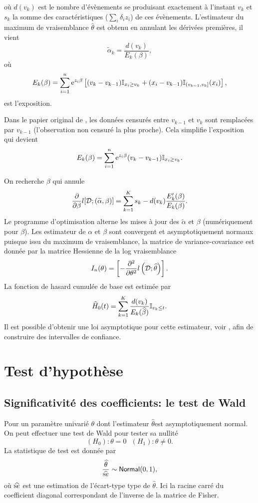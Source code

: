 où $d(v_k)$ est le nombre d'évènements se produisant exactement à l'instant $v_k$ et $s_k$ la somme des caractéristiques ($\sum_i \delta_i z_i$) de ces évènements. L'estimateur du maximum de vraisemblance $\widehat{\theta}$ est obtenu en annulant les dérivées premières, il vient 
$$
\widetilde{\alpha}_k = \frac{d(v_k)}{E_k(\beta)}, 
$$
où 
$$
E_k(\beta) = \sum_{i=1}^{n}\mathrm{e}^{z_i\beta}\left[(v_k - v_{k-1})\mathbb{I}_{x_i\geq v_k} +(x_i - v_{k-1})\mathbb{I}_{(v_{k-1},v_k]}(x_i)\right],
$$ 
est l'exposition.
\begin{remark}
Dans le papier original de \citet{Breslow1975}, les données censurés entre $v_{k-1}$ et $v_k$ sont remplacées par $v_{k-1}$ (l'observation non censuré la plus proche). Cela simplifie l'exposition qui devient 
$$
E_k(\beta) = \sum_{i=1}^{n}\mathrm{e}^{z_i\beta}(v_k - v_{k-1})\mathbb{I}_{x_i\geq v_k}.
$$
\end{remark}
On recherche $\beta$ qui annule
$$
\frac{\partial}{\partial \beta}l[\mathcal{D}; (\widetilde{\alpha},\beta) ] = \sum_{k=1}^K s_k - d(v_k)\frac{E_k'(\beta)}{E_k(\beta)}.
$$
Le programme d'optimisation alterne les mises à jour des $\tilde{\alpha}$ et $\beta$ (numériquement pour $\beta$). Les estimateur de $\alpha$ et $\beta$ sont convergent et asymptotiquement normaux puisque issu du maximum de vraisemblance, la matrice de variance-covariance est donnée par la matrice Hessienne de la log vraisemblance
$$
I_n(\theta) = \left[-\frac{\partial^2}{\partial\theta^2}l\left(\mathcal{D};\widehat{\theta}\right)\right].
$$ La fonction de hasard cumulée de base est estimée par 
$$
\widehat{H}_0(t) = \sum_{k=1}^K\frac{d(v_k)}{E_k(\widehat{\beta})}\mathbb{I}_{v_k\leq t}.
$$
Il est possible d'obtenir une loi asymptotique pour cette estimateur, voir \citet{Spiekerman1998}, afin de construire des intervalles de confiance.
\section{Test d'hypothèse}
\subsection{Significativité des coefficients: le test de Wald}
Pour un paramètre univarié $\theta$ dont l'estimateur $\widehat{\theta}$est asymptotiquement normal. On peut effectuer une test de Wald pour tester sa nullité
$$
(H_0): \theta =0\text{  }(H_1):\theta\neq 0.
$$
La statistique de test est donnée par
$$
\frac{\widehat{\theta}}{\widehat{\text se}}\sim\mathsf{Normal}(0,1),
$$ 
où $\widehat{\text se}$ est une estimation de l'écart-type type de $\widehat{\theta}.$ Ici la racine carré du coefficient diagonal correspondant de l'inverse de la matrice de Fisher.
